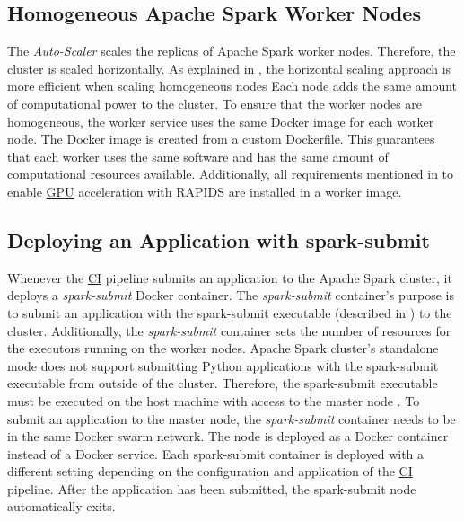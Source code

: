 \subsection{Homogeneous Apache Spark Worker Nodes}
The \textit{Auto-Scaler} scales the replicas of Apache Spark worker nodes. Therefore, the cluster is scaled horizontally. As explained in , the horizontal scaling approach is more efficient when scaling homogeneous nodes Each node adds the same amount of computational power to the cluster.
To ensure that the worker nodes are homogeneous, the worker service uses the same Docker image for each worker node. The Docker image is created from a custom Dockerfile.
This guarantees that each worker uses the same software and has the same amount of computational resources available.
Additionally, all requirements mentioned in  to enable \hyperlink{abbr:gpu}{GPU} acceleration with RAPIDS are installed in a worker image.


\subsection{Deploying an Application with spark-submit}
\label{subsec:05_spark_spark-submit}
Whenever the \hyperlink{abbr:ci}{CI} pipeline submits an application to the Apache Spark cluster, it deploys a \textit{spark-submit} Docker container.
The \textit{spark-submit} container's purpose is to submit an application with the spark-submit executable (described in ) to the cluster.
Additionally, the \textit{spark-submit} container sets the number of resources for the executors running on the worker nodes.
Apache Spark cluster's standalone mode does not support submitting Python applications with the spark-submit executable from outside of the cluster. Therefore, the spark-submit executable must be executed on the host machine with access to the master node \cite{Apache2020Spark}.
To submit an application to the master node, the \textit{spark-submit} container needs to be in the same Docker swarm network. The node is deployed as a Docker container instead of a Docker service. Each spark-submit container is deployed with a different setting depending on the configuration and application of the \hyperlink{abbr:ci}{CI} pipeline.
After the application has been submitted, the spark-submit node automatically exits.


